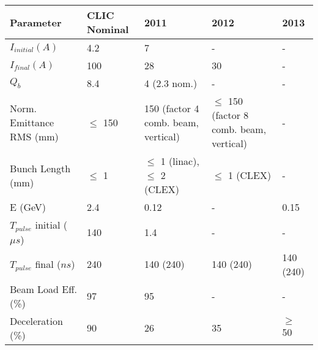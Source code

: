 \begin{sidewaystable}[!htb]
\begin{tabularx}{\textwidth}{X | X | X | X | X}
    \textbf{Parameter}                     & \textbf{CLIC Nominal}          & \textbf{2011}                                              & \textbf{2012}                                       & \textbf{2013}                     \\ \hline
        $I_{initial} (A)$             & 4.2                   & 7                                                 & -                                          & -                        \\
        $I_{final} (A)$               & 100                   & 28                                                & 30                                         & -                        \\
        $Q_b$                         & 8.4                   & 4 (2.3 nom.)                                      & -                                          & -                        \\
        Norm. Emittance RMS (mm)      & $\leq$ 150            & 150 (factor 4 comb. beam, vertical)               & $\leq$ 150 (factor 8 comb. beam, vertical) & -                        \\
        Bunch Length (mm)             & $\leq$ 1              & $\leq$ 1 (linac), $\leq$ 2 (CLEX)                 & $\leq$ 1 (CLEX)                            & -                        \\
        E (GeV)                       & 2.4                   & 0.12                                              & -                                          & 0.15                     \\
        $T_{pulse}$ initial ($\mu s$) & 140                   & 1.4                                               & -                                          & -                        \\
        $T_{pulse}$ final ($ns$)      & 240                   & 140 (240)                                         & 140 (240)                                  & 140 (240)                \\
        Beam Load Eff. (\%)           & 97                    & 95                                                & -                                          & -                        \\
        Deceleration (\%)             & 90                    & 26                                                & 35                                         & $\geq$ 50                \\

\end{tabularx}
\end{sidewaystable}
